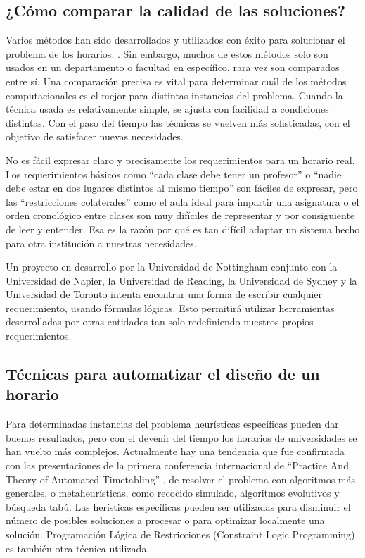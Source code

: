 \subsection{¿Cómo comparar la calidad de las soluciones?}

Varios métodos han sido desarrollados y utilizados con éxito para solucionar el problema de los horarios.
\cite{VA Bardadym, MW Carter, MW Carter and G Laporte, JH Kingston}. Sin embargo, muchos de estos métodos 
solo son usados en un departamento o facultad en específico, rara vez son comparados entre sí. Una 
comparación precisa es vital para determinar cuál de los métodos computacionales es el mejor para
distintas instancias del problema. Cuando la técnica usada es relativamente simple, se ajusta con facilidad
a condiciones distintas. Con el paso del tiempo las técnicas se vuelven más sofisticadas, con el objetivo
de satisfacer nuevas necesidades.

No es fácil expresar claro y precisamente los requerimientos para un horario real. Los requerimientos básicos
como ``cada clase debe tener un profesor'' o ``nadie debe estar en dos lugares distintos al mismo tiempo'' son
fáciles de expresar, pero las ``restricciones colaterales'' como el aula ideal para impartir una asignatura o
el orden cronológico entre clases son muy difíciles de representar y por consiguiente de leer y entender. Esa
es la razón por qué es tan difícil adaptar un sistema hecho para otra institución a nuestras necesidades.

Un proyecto en desarrollo por la Universidad de Nottingham conjunto con la Universidad de Napier, la Universidad
de Reading, la Universidad de Sydney y la Universidad de Toronto intenta encontrar una forma de escribir cualquier
requerimiento, usando fórmulas lógicas. Esto permitirá utilizar herramientas desarrolladas por otras entidades tan
solo redefiniendo nuestros propios requerimientos.

\subsection{Técnicas para automatizar el diseño de un horario}

Para determinadas instancias del problema heurísticas específicas pueden dar buenos resultados, pero con el devenir del tiempo los horarios de universidades se han vuelto más complejos. Actualmente hay una tendencia que fue confirmada
con las presentaciones de la primera conferencia internacional de ``Practice And Theory of Automated Timetabling''
\cite{D Abramson and J Abela}, de resolver el problema con algoritmos más generales, o metaheurísticas, como
recocido simulado, algoritmos evolutivos y búsqueda tabú. Las herísticas específicas pueden ser utilizadas
para disminuir el número de posibles soluciones a procesar o para optimizar localmente una solución. Programación
Lógica de Restricciones (Constraint Logic Programming) es también otra técnica utilizada.

